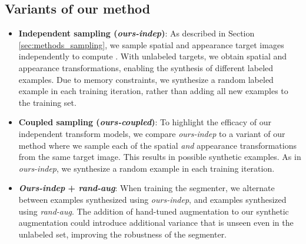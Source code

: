 \documentclass[10pt,twocolumn,letterpaper]{article}
\begin{document}
\subsection{Variants of our method}
\begin{itemize}[leftmargin=-2pt]
\item[] \textbf{Independent sampling (\textit{ours-indep})}: As described in Section \ref{sec:methods_sampling}, we sample spatial and appearance target images independently to compute . With  unlabeled targets, we obtain  spatial and  appearance transformations, enabling the synthesis of  different labeled examples. Due to memory constraints, we synthesize a random labeled example in each training iteration, rather than adding all  new examples to the training set.

\item[] \textbf{Coupled sampling (\textit{ours-coupled})}: To highlight the efficacy of our independent transform models, we compare \textit{ours-indep} to a variant of our method where we sample each of the spatial \textit{and} appearance transformations from the same target image. This results in  possible synthetic examples. As in \textit{ours-indep}, we synthesize a random example in each training iteration.

\item[] \textbf{\textit{Ours-indep} + \textit{rand-aug}}: When training the segmenter, we alternate between examples synthesized using \textit{ours-indep}, and examples synthesized using \textit{rand-aug}. The addition of hand-tuned augmentation to our synthetic augmentation could introduce additional variance that is unseen even in the unlabeled set, improving the robustness of the segmenter.
\end{itemize}
\end{document}
